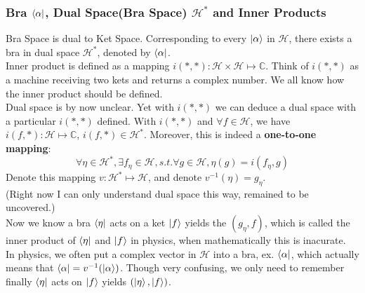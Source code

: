 \documentclass[a4paper, 11pt]{article}
\begin{document}
\subsubsection{Bra $\bra{\alpha}$, Dual Space(Bra Space) $\mathcal{H}^*$ and Inner Products}
Bra Space is dual to Ket Space. Corresponding to every $\ket{\alpha}$ in $\mathcal{H}$, there exists a bra in dual space $\mathcal{H}^*$, denoted by $\bra{\alpha}$.\\
\indent Inner product is defined as a mapping $i(*, *): \mathcal{H}\times\mathcal{H} \mapsto \mathbb{C}$. Think of $i(*, *)$ as a machine receiving two kets and returns a complex number. We all know how the inner product should be defined.\\
\indent Dual space is by now unclear. Yet with $i(*, *)$ we can deduce a dual space with a particular $i(*, *)$ defined. With $i(*, *)$ and $\forall f \in \mathcal{H}$, we have $i(f, *): \mathcal{H} \mapsto \mathbb{C}$, $i(f, *) \in \mathcal{H}^*$. Moreover, this is indeed a \textbf{one-to-one mapping}:
\begin{equation}
\forall \eta \in \mathcal{H}^*, \exists f_{\eta} \in \mathcal{H}, s.t. \forall g \in \mathcal{H}, \eta(g) = i(f_{\eta}, g)
\end{equation}
\indent Denote this mapping $v: \mathcal{H}^* \mapsto \mathcal{H}$, and denote $v^{-1}(\eta) = g_{\eta}$. \\
(Right now I can only understand dual space this way, remained to be uncovered.)\\
\indent Now we know a bra $\bra{\eta}$ acts on a ket $\ket{f}$ yields the $(g_{\eta}, f)$, which is called the inner product of $\bra{\eta}$ and $\ket{f}$ in physics, when mathematically this is inacurate.\\
\indent In physics, we often put a complex vector in $\mathcal{H}$ into a bra, ex. $\bra{\alpha}$, which actually means that $\bra{\alpha} = v^{-1}(\ket{\alpha})$. Though very confusing, we only need to remember finally $\bra{\eta}$ acts on $\ket{f}$ yields $(\ket{\eta}, \ket{f})$.
\end{document}
